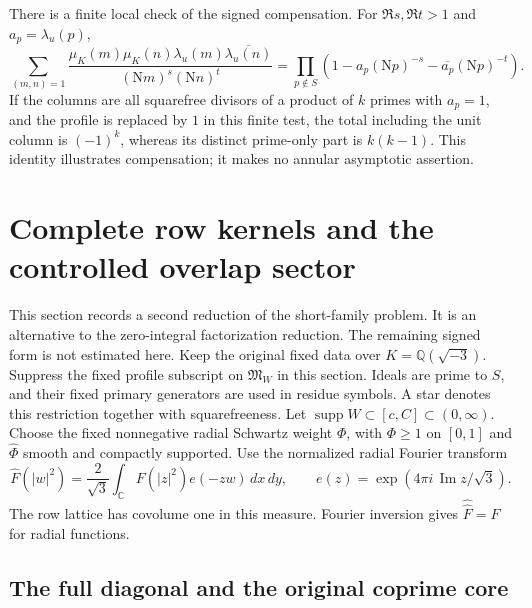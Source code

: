 \documentclass[11pt]{article}
\numberwithin{equation}{section}
\theoremstyle{definition}
\theoremstyle{remark}
\newcommand{\N}{\mathrm N}
\newcommand{\OO}{\mathcal O}
\newcommand{\muK}{\mu_K}
\newcommand{\ind}{\mathbf 1}
\newcommand{\rad}{\operatorname{rad}}
\newcommand{\Mfrak}{\mathfrak M}
\newcommand{\eps}{\varepsilon}
\begin{document}
There is a finite local check of the signed compensation.  For
$\Re s,\Re t>1$ and $a_p=\lambda_u(p)$,
\[
 \sum_{(m,n)=1}\frac{\mu_K(m)\mu_K(n)\lambda_u(m)
          \overline{\lambda_u(n)}}{(\N m)^s(\N n)^t}
 =\prod_{p\notin S}(1-a_p(\N p)^{-s}-\overline{a_p}(\N p)^{-t}).
\]
If the columns are all squarefree divisors of a product of $k$ primes
with $a_p=1$, and the profile is replaced by $1$ in this finite test,
the total including the unit column is $(-1)^k$, whereas its distinct
prime-only part is $k(k-1)$.  This identity illustrates compensation;
it makes no annular asymptotic assertion.


\section{Complete row kernels and the controlled overlap sector}
\label{sec:complete-kernels}\label{sec:overlap}

This section records a second reduction of the short-family problem.
It is an alternative to the zero-integral factorization reduction.
The remaining signed form is not estimated here.
Keep the original fixed data over \(K=\mathbb Q(\sqrt{-3})\).
Suppress the fixed profile subscript on \(\Mfrak_W\) in this section.
Ideals are prime to \(S\), and their fixed primary generators are used
in residue symbols. A star denotes this restriction together with
squarefreeness. Let \(\operatorname{supp}W\subset[c,C]\subset(0,\infty)\).
Choose the fixed nonnegative radial Schwartz weight \(\Phi\), with
\(\Phi\ge1\) on \([0,1]\) and \(\widehat\Phi\) smooth and compactly
supported. Use the normalized radial Fourier transform
\[
 \widehat F(|w|^2)=\frac2{\sqrt3}\int_{\mathbb C}
      F(|z|^2)e(-zw)\,dx\,dy,\qquad
 e(z)=\exp(4\pi i\,\operatorname{Im}z/\sqrt3).
\]
The row lattice has covolume one in this measure. Fourier inversion
gives \(\widehat{\widehat F}=F\) for radial functions.

\subsection{The full diagonal and the original coprime core}
\end{document}
